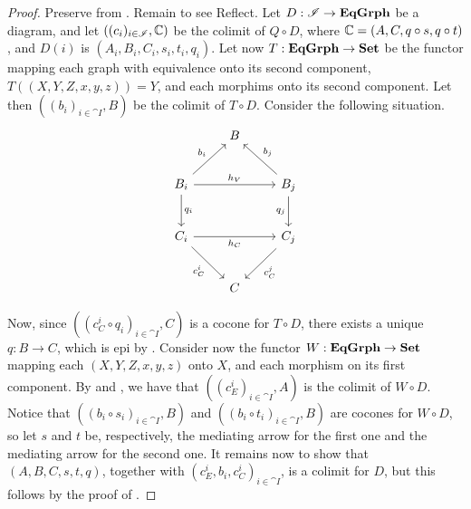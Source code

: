 \begin{proof}
    Preserve from . Remain to see Reflect.
	Let $D: \mathscr{I} \to \mathbf{EqGrph}$ be a diagram, and let $((c_i)_{i\in \mathscr{I}}, \mathbb{C})$ be the colimit of $Q \circ D$, where $\mathbb{C} = (A, C, q\circ s, q\circ t)$, and $D(i)$ is $(A_i, B_i, C_i, s_i, t_i, q_i)$.
	Let now $T: \mathbf{EqGrph} \to \mathbf{Set}$ be the functor mapping each graph with equivalence onto its second component, $T((X, Y, Z, x, y, z)) = Y$, and each morphims onto its second component.
	Let then $((b_i)_{i\in \cat I}, B)$ be the colimit of $T \circ D$.
	Consider the following situation.
	\[\begin{tikzcd}[row sep = 24, column sep = 24]
		& B & \\
		B_i \ar[ur, "{b_i}"] \ar[rr, "h_V"] \ar[d, "{q_i}"] & & B_j \ar[ul, "{b_j}"swap] \ar[d, "{q_j}" swap] \\
		C_i \ar[dr, "{c_C^i}" swap] \ar[rr, "{h_C}"swap] & & C_j \ar[dl, "{c_C^j}"] \\
		& C &
	\end{tikzcd}\]

	Now, since $((c^i_C \circ q_i)_{i \in \cat I}, C)$ is a cocone for $T \circ D$, there exists a unique $q: B \to C$, which is epi by .
	Consider now the functor $W: \mathbf{EqGrph} \to \mathbf{Set}$ mapping each $(X, Y, Z, x, y, z)$ onto $X$, and each morphism on its first component. By  and , we have that $((c_E^i)_{i \in \cat I}, A)$ is the colimit of $W \circ D$.
	Notice that $((b_i \circ s_i)_{i \in \cat{I}}, B)$ and $((b_i \circ t_i)_{i \in \cat I}, B)$ are cocones for $W \circ D$, so let $s$ and $t$ be, respectively, the mediating arrow for the first one and the mediating arrow for the second one. It remains now to show that $(A, B, C, s, t, q)$, together with $(c_E^i, b_i, c_C^i)_{i \in \cat I}$, is a colimit for $D$, but this follows by the proof of .
\end{proof}

